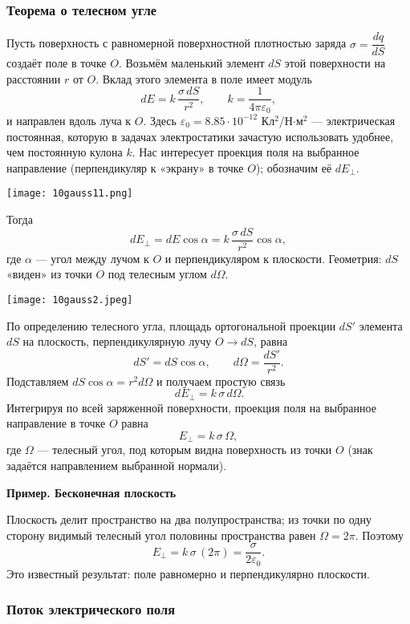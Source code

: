 \documentclass[12pt, a4paper]{article}%
\begin{document}
\subsubsection*{Теорема о телесном угле}
Пусть поверхность с равномерной поверхностной плотностью заряда $\sigma = \dfrac{dq}{dS}$ создаёт поле в точке $O$. Возьмём маленький элемент $dS$ этой поверхности на расстоянии $r$ от $O$. Вклад этого элемента в поле имеет модуль
\[
dE = k\,\frac{\sigma\,dS}{r^2}, \qquad k=\frac{1}{4\pi\varepsilon_0},
\]
и направлен вдоль луча к $O$. Здесь $\varepsilon_0 = 8.85\cdot10^{-12}$ Кл$^2$/Н$\cdot$м$^2$ --- электрическая постоянная, которую в задачах электростатики зачастую использовать удобнее, чем постоянную кулона $k$. Нас интересует проекция поля на выбранное направление (перпендикуляр к «экрану» в точке $O$); обозначим её $dE_\perp$.

\begin{center}
\texttt{[image: 10gauss11.png]}
\label{fig:mpr}
\end{center}

Тогда
\[
dE_\perp = dE\cos\alpha = k\,\frac{\sigma\,dS}{r^2}\cos\alpha,
\]
где $\alpha$ --- угол между лучом к $O$ и перпендикуляром к плоскости.
Геометрия: $dS$ «виден» из точки $O$ под телесным углом $d\Omega$.

\begin{center}
\texttt{[image: 10gauss2.jpeg]}
\label{fig:mpr}
\end{center}

По определению телесного угла, площадь ортогональной проекции $dS'$ элемента $dS$ на плоскость, перпендикулярную лучу $O\!\to\! dS$, равна
\[
dS' = dS\cos\alpha,\qquad d\Omega = \frac{dS'}{r^2}.
\]
Подставляем $dS\cos\alpha = r^2 d\Omega$ и получаем простую связь
\[
\,dE_\perp = k\,\sigma\,d\Omega.
\]
Интегрируя по всей заряженной поверхности, проекция поля на выбранное направление в точке $O$ равна
\[
\boxed{\,E_\perp = k\,\sigma\,\Omega,\,}
\]
где $\Omega$ — телесный угол, под которым видна поверхность из точки $O$ (знак задаётся направлением выбранной нормали).

\textbf{Пример. Бесконечная плоскость} 

Плоскость делит пространство на два полупространства; из точки по одну сторону видимый телесный угол половины пространства равен $\Omega=2\pi$. Поэтому
\[
E_\perp = k\,\sigma\,(2\pi) = \frac{\sigma}{2\varepsilon_0}.
\]
Это известный результат: поле равномерно и перпендикулярно плоскости.

\subsubsection*{Поток электрического поля}
\end{document}
